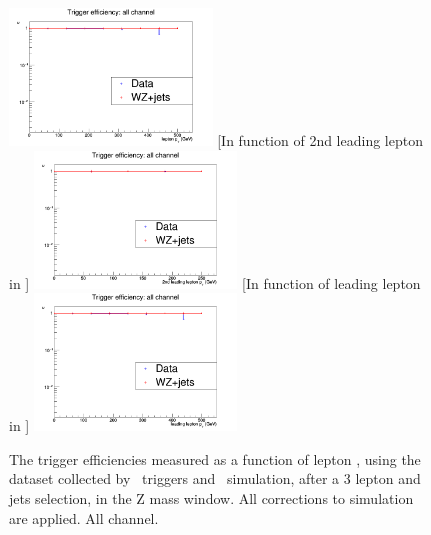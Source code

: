 \begin{figure}[tb]
	[In function of lepton \pt]{
		\includegraphics[width=0.48\textwidth]{Appendix/Figures/trigger/Triggereff/all/triggeff_allhistPt.png}
		\label{image:triggeff_allhistPt.png}
	}
	[In function of 2nd leading lepton in \pt]{
		\includegraphics[width=0.48\textwidth]{Appendix/Figures/trigger/Triggereff/all/triggeff_allhistPt_2ndleadinglep.png}
		\label{image:triggeff_allhistPt_2ndleadinglep.png}
	}
	[In function of leading lepton in \pt]{
		\includegraphics[width=0.48\textwidth]{Appendix/Figures/trigger/Triggereff/all/triggeff_allhistPt_leadinglep.png}
		\label{image:triggeff_allhistPt_leadinglep.png}
	}
	\caption{The trigger efficiencies measured as a function of lepton \pt, using the dataset collected by \Etmis\ triggers and \WZ\ simulation, after a 3 lepton and jets selection, in the Z mass window. All corrections to simulation are applied. All channel.}
	\label{image:FigurestriggerTriggereffall}
\end{figure}

